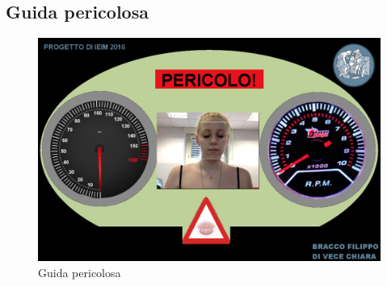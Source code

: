 \documentclass[12pt]{article}
\begin{document}
	\subsection{Guida pericolosa}
	
		\begin{figure}[H]
			\centering
			\includegraphics[width=0.8\linewidth]{../Assets/Img/guida_pericolosa_tex.png}
			\caption{Guida pericolosa}
			\label{fig:guidapericolosa}
		\end{figure}
\end{document}
